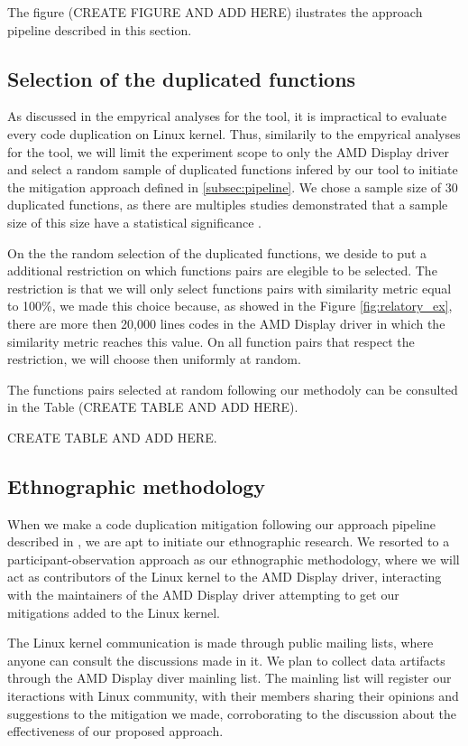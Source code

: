 The figure (CREATE FIGURE AND ADD HERE) ilustrates the approach pipeline described in this section.

\subsection{Selection of the duplicated functions}

As discussed in the empyrical analyses for the tool, it is impractical to evaluate every code duplication on Linux kernel. Thus,
similarily to the empyrical analyses for the tool, we will limit the experiment scope to only the AMD Display driver and select
a random sample of duplicated functions infered by our tool to initiate the mitigation approach defined in \ref{subsec:pipeline}. 
We chose a sample size of 30 duplicated functions, as there are multiples studies demonstrated that a sample size of this size 
have a statistical significance \citep{sample1,sample2}.

On the the random selection of the duplicated functions, we deside to put a additional restriction on which functions pairs are 
elegible to be selected. The restriction is that we will only select functions pairs with similarity metric equal 
to 100\%, we made this choice because, as showed in the Figure \ref{fig:relatory_ex}, there are more then 20,000 lines codes 
in the AMD Display driver in which the similarity metric reaches this value. On all function pairs that respect the restriction,
we will choose then uniformly at random.

The functions pairs selected at random following our methodoly can be consulted in the Table (CREATE TABLE AND ADD HERE).

CREATE TABLE AND ADD HERE.

\subsection{Ethnographic methodology}

When we make a code duplication mitigation following our approach pipeline described in \citep{subsec:pipeline}, we are apt
to initiate our ethnographic research. We resorted to a participant-observation approach as our ethnographic methodology, where we 
will act as contributors of the Linux kernel to the AMD Display driver, interacting with the maintainers of the AMD Display driver
attempting to get our mitigations added to the Linux kernel. 

The Linux kernel communication is made through public mailing lists, where anyone can consult the discussions made in it.
We plan to collect data artifacts through the AMD Display diver mainling list.
The mainling list will register our iteractions with Linux community, with 
their members sharing their opinions and suggestions to the mitigation we made, corroborating to the discussion about the 
effectiveness of our proposed approach.

